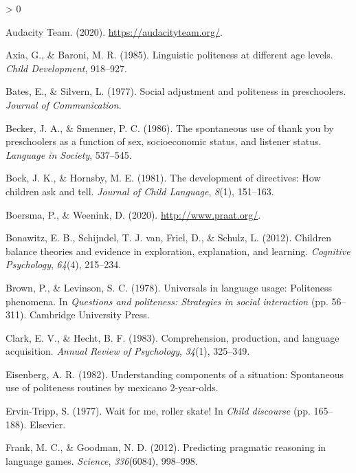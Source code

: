 \documentclass[
  english,
  man,floatsintext]{apa6}
\newlength{\cslhangindent}
\newenvironment{CSLReferences}[2] %
 {%
  \setlength{\parindent}{0pt}
  \ifodd #1 \everypar{\setlength{\hangindent}{\cslhangindent}}\ignorespaces\fi
  \ifnum #2 > 0
  \setlength{\parskip}{#2\baselineskip}
  \fi
 }%
 {}
\begin{document}
\hypertarget{refs}{}
\begin{CSLReferences}{1}{0}
\leavevmode\hypertarget{ref-audacity2020}{}%
Audacity Team. (2020). \url{https://audacityteam.org/}.

\leavevmode\hypertarget{ref-axia1985}{}%
Axia, G., \& Baroni, M. R. (1985). Linguistic politeness at different age levels. \emph{Child Development}, 918--927.

\leavevmode\hypertarget{ref-bates1977}{}%
Bates, E., \& Silvern, L. (1977). Social adjustment and politeness in preschoolers. \emph{Journal of Communication}.

\leavevmode\hypertarget{ref-becker1986}{}%
Becker, J. A., \& Smenner, P. C. (1986). The spontaneous use of thank you by preschoolers as a function of sex, socioeconomic status, and listener status. \emph{Language in Society}, 537--545.

\leavevmode\hypertarget{ref-bock1981}{}%
Bock, J. K., \& Hornsby, M. E. (1981). The development of directives: How children ask and tell. \emph{Journal of Child Language}, \emph{8}(1), 151--163.

\leavevmode\hypertarget{ref-boersma2020}{}%
Boersma, P., \& Weenink, D. (2020). \url{http://www.praat.org/}.

\leavevmode\hypertarget{ref-bonawitz2012}{}%
Bonawitz, E. B., Schijndel, T. J. van, Friel, D., \& Schulz, L. (2012). Children balance theories and evidence in exploration, explanation, and learning. \emph{Cognitive Psychology}, \emph{64}(4), 215--234.

\leavevmode\hypertarget{ref-brown1978}{}%
Brown, P., \& Levinson, S. C. (1978). Universals in language usage: Politeness phenomena. In \emph{Questions and politeness: Strategies in social interaction} (pp. 56--311). Cambridge University Press.

\leavevmode\hypertarget{ref-clark1983}{}%
Clark, E. V., \& Hecht, B. F. (1983). Comprehension, production, and language acquisition. \emph{Annual Review of Psychology}, \emph{34}(1), 325--349.

\leavevmode\hypertarget{ref-eisenberg1982}{}%
Eisenberg, A. R. (1982). Understanding components of a situation: Spontaneous use of politeness routines by mexicano 2-year-olds.

\leavevmode\hypertarget{ref-ervintripp1977}{}%
Ervin-Tripp, S. (1977). Wait for me, roller skate! In \emph{Child discourse} (pp. 165--188). Elsevier.

\leavevmode\hypertarget{ref-frank2012}{}%
Frank, M. C., \& Goodman, N. D. (2012). Predicting pragmatic reasoning in language games. \emph{Science}, \emph{336}(6084), 998--998.


\end{CSLReferences}
\end{document}
